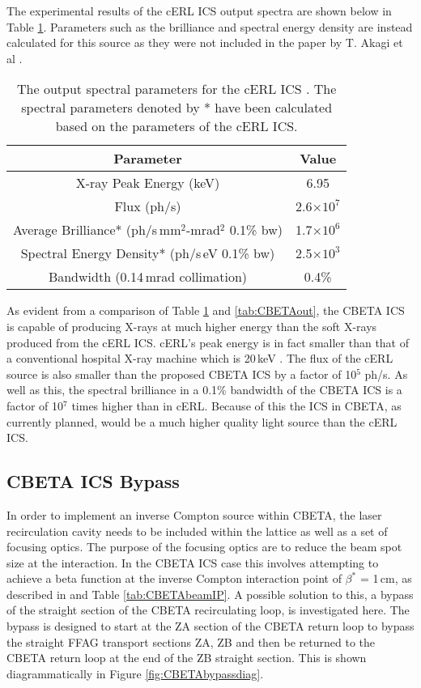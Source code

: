 \documentclass[11pt]{article}
\begin{document}
The experimental results of the cERL ICS output spectra are shown below in Table \ref{tab:cERLout}. Parameters such as the brilliance and spectral energy density are instead calculated for this source as they were not included in the paper by T. Akagi et al \cite{TAkagicERL}.

\begin{table}[H]
\centering
\begin{tabular}{|c||c|}
\hline
\textbf{Parameter} & \textbf{Value} \\
\hline
X-ray Peak Energy (keV) & 6.95 \\
\hline
Flux (ph/s) & 2.6$\times 10^{7}$ \\
\hline
Average Brilliance* (ph/s\,mm$^{2}$-mrad$^{2}$ 0.1\% bw) & 1.7$\times 10^{6}$ \\
\hline
Spectral Energy Density* (ph/s\,eV 0.1\% bw) & 2.5$\times 10^{3}$ \\
\hline
Bandwidth (0.14\,mrad collimation) & 0.4\% \\
\hline
\end{tabular}
\caption{\label{tab:cERLout} The output spectral parameters for the cERL ICS \cite{TAkagicERL}. The spectral parameters denoted by * have been calculated based on the parameters of the cERL ICS.}
\end{table}

As evident from a comparison of Table \ref{tab:cERLout} and \ref{tab:CBETAout}, the CBETA ICS is capable of producing X-rays at much higher energy than the soft X-rays produced from the cERL ICS. cERL's peak energy is in fact smaller than that of a conventional hospital X-ray machine which is 20\,keV \cite{HospX}.  The flux of the cERL source is also smaller than the proposed CBETA ICS by a factor of 10$^{5}$ ph/s. As well as this, the spectral brilliance in a 0.1\% bandwidth of the CBETA ICS is a factor of 10$^{7}$ times higher than in cERL. Because of this the ICS in CBETA, as currently planned, would be a much higher quality light source than the cERL ICS.  


\subsection{CBETA ICS Bypass}
\label{sec:bypass}

In order to implement an inverse Compton source within CBETA, the laser recirculation cavity needs to be included within the lattice as well as a set of focusing optics. The purpose of the focusing optics are to reduce the beam spot size at the interaction. In the CBETA ICS case this involves attempting to achieve a beta function at the inverse Compton interaction point of $\beta^{*}$ = 1\,cm, as described in \cite{KirstenIPAC} and Table \ref{tab:CBETAbeamIP}. A possible solution to this, a bypass of the straight section of the CBETA recirculating loop, is investigated here. The bypass is designed to start at the ZA section of the CBETA return loop to bypass the straight FFAG transport sections ZA, ZB and then be returned to the CBETA return loop at the end of the ZB straight section. This is shown diagrammatically in Figure \ref{fig:CBETAbypassdiag}.
\end{document}
